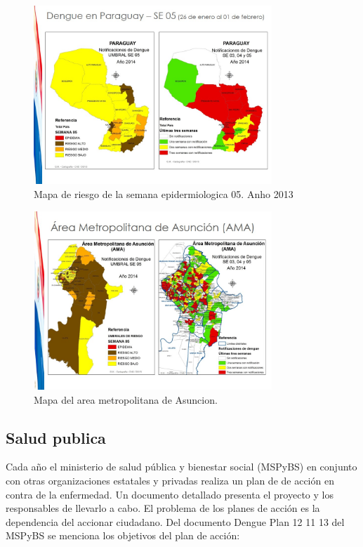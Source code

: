 \begin{figure}
\centering
\includegraphics[width=0.8\textwidth]{./graphics/Diapositiva04.JPG}
\caption{\label{fig:mapa2}Mapa de riesgo de la semana epidermiologica 05. Anho 2013 }
\end{figure}

\begin{figure}
\centering
\includegraphics[width=0.8\textwidth]{./graphics/Diapositiva05.JPG}
\caption{\label{fig:mapa3}Mapa del area metropolitana de Asuncion.}
\end{figure}

\subsection{Salud publica}
Cada año el ministerio de salud pública y bienestar social (MSPyBS) en conjunto con otras organizaciones estatales y privadas realiza un plan de de acción en contra de la enfermedad. Un documento detallado presenta el proyecto y los responsables de llevarlo a cabo. El problema de los planes de acción es la dependencia del accionar ciudadano.
Del documento Dengue Plan 12 11 13 del MSPyBS se menciona los objetivos del plan de acción: \\

